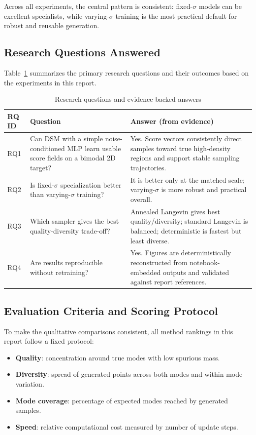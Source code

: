 \documentclass[journal]{IEEEtran}
\begin{document}
Across all experiments, the central pattern is consistent: fixed-$\sigma$ models can be excellent specialists, while varying-$\sigma$ training is the most practical default for robust and reusable generation.

\subsection{Research Questions Answered}

Table~\ref{tab:rq_answers} summarizes the primary research questions and their outcomes based on the experiments in this report.

\begin{table}[t]
\centering
\small
\setlength{\tabcolsep}{3pt}
\begin{tabular}{p{}p{}p{}}
\toprule
RQ ID & Question & Answer (from evidence) \\
\midrule
RQ1 & Can DSM with a simple noise-conditioned MLP learn usable score fields on a bimodal 2D target? &
Yes. Score vectors consistently direct samples toward true high-density regions and support stable sampling trajectories. \\
\midrule
RQ2 & Is fixed-$\sigma$ specialization better than varying-$\sigma$ training? &
It is better only at the matched scale; varying-$\sigma$ is more robust and practical overall. \\
\midrule
RQ3 & Which sampler gives the best quality-diversity trade-off? &
Annealed Langevin gives best quality/diversity; standard Langevin is balanced; deterministic is fastest but least diverse. \\
\midrule
RQ4 & Are results reproducible without retraining? &
Yes. Figures are deterministically reconstructed from notebook-embedded outputs and validated against report references. \\
\bottomrule
\end{tabular}
\normalsize
\caption{Research questions and evidence-backed answers}
\label{tab:rq_answers}
\end{table}

\subsection{Evaluation Criteria and Scoring Protocol}

To make the qualitative comparisons consistent, all method rankings in this report follow a fixed protocol:
\begin{itemize}
    \item \textbf{Quality}: concentration around true modes with low spurious mass.
    \item \textbf{Diversity}: spread of generated points across both modes and within-mode variation.
    \item \textbf{Mode coverage}: percentage of expected modes reached by generated samples.
    \item \textbf{Speed}: relative computational cost measured by number of update steps.
\end{itemize}
\end{document}
